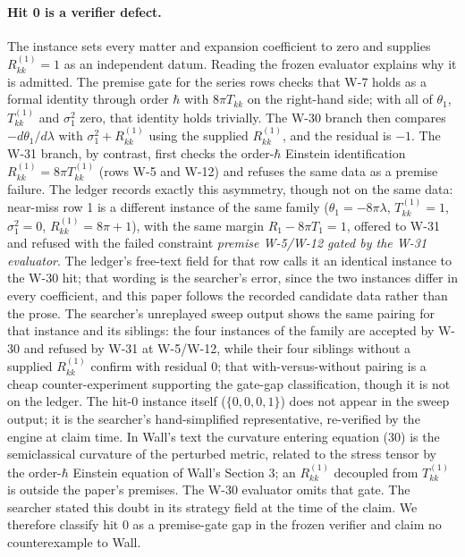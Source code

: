 \documentclass[11pt]{article}
\begin{document}
\paragraph{Hit 0 is a verifier defect.} The instance sets every matter and expansion coefficient to zero and supplies $R^{(1)}_{kk} = 1$ as an independent datum. Reading the frozen evaluator explains why it is admitted. The premise gate for the series rows checks that W-7 holds as a formal identity through order $\hbar$ with $8\pi T_{kk}$ on the right-hand side; with all of $\theta_1$, $T^{(1)}_{kk}$ and $\sigma^2_1$ zero, that identity holds trivially. The W-30 branch then compares $-d\theta_1/d\lambda$ with $\sigma^2_1 + R^{(1)}_{kk}$ using the supplied $R^{(1)}_{kk}$, and the residual is $-1$. The W-31 branch, by contrast, first checks the order-$\hbar$ Einstein identification $R^{(1)}_{kk} = 8\pi T^{(1)}_{kk}$ (rows W-5 and W-12) and refuses the same data as a premise failure. The ledger records exactly this asymmetry, though not on the same data: near-miss row 1 is a different instance of the same family ($\theta_1 = -8\pi\lambda$, $T^{(1)}_{kk} = 1$, $\sigma^2_1 = 0$, $R^{(1)}_{kk} = 8\pi + 1$), with the same margin $R_1 - 8\pi T_1 = 1$, offered to W-31 and refused with the failed constraint \emph{premise W-5/W-12 gated by the W-31 evaluator}. The ledger's free-text field for that row calls it an identical instance to the W-30 hit; that wording is the searcher's error, since the two instances differ in every coefficient, and this paper follows the recorded candidate data rather than the prose. The searcher's unreplayed sweep output shows the same pairing for that instance and its siblings: the four instances of the family are accepted by W-30 and refused by W-31 at W-5/W-12, while their four siblings without a supplied $R^{(1)}_{kk}$ confirm with residual $0$; that with-versus-without pairing is a cheap counter-experiment supporting the gate-gap classification, though it is not on the ledger. The hit-0 instance itself ($\{0,0,0,1\}$) does not appear in the sweep output; it is the searcher's hand-simplified representative, re-verified by the engine at claim time. In Wall's text the curvature entering equation (30) is the semiclassical curvature of the perturbed metric, related to the stress tensor by the order-$\hbar$ Einstein equation of Wall's Section 3; an $R^{(1)}_{kk}$ decoupled from $T^{(1)}_{kk}$ is outside the paper's premises. The W-30 evaluator omits that gate. The searcher stated this doubt in its strategy field at the time of the claim. We therefore classify hit 0 as a premise-gate gap in the frozen verifier and claim no counterexample to Wall.
\end{document}
